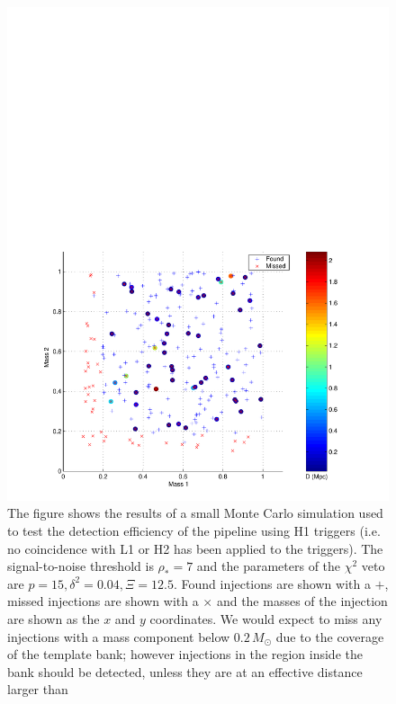\begin{figure}[p]
\begin{center}
\includegraphics[width=\textwidth]{figures/result/h1_inj_mass_7_0_delta_0_04_chisq_12_5}
\end{center}
\caption[Found and Missed H1 Injections for $\Xi = 12.5 \delta^2 = 0.04$]{%
\label{f:h1_missed_tuning}%
The figure shows the results of a small Monte Carlo simulation used to test
the detection efficiency of the pipeline using H1 triggers (i.e. no
coincidence with L1 or H2 has been applied to the triggers). The
signal-to-noise threshold is $\rho_\ast = 7$ and the parameters of the
$\chi^2$ veto are $p = 15, \delta^2 = 0.04, \Xi = 12.5$. Found injections are
shown with a $+$, missed injections are shown with a $\times$ and the masses
of the injection are shown as the $x$ and $y$ coordinates. We would expect to
miss any injections with a mass component below $0.2\,M_\odot$ due to the
coverage of the template bank; however injections in the region inside the
bank should be detected, unless they are at an effective distance larger than
}
\end{figure}
